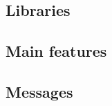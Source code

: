 \documentclass {beamer}                                                                                         %
\begin{document}
\subsection {Libraries}                                                          %
\subsection {Main features}                                                          %
\subsection {Messages}                                                                              %
\end{document}
